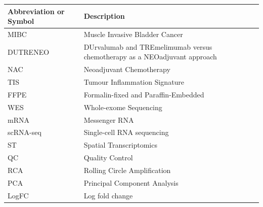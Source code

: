 \documentclass[
	a4paper, %
	fontsize=10pt, %
	twoside=true, %
	open=any, %
	numbers=noenddot, %
]{kaobook}
\begin{document}
\begin{center}
\begin{tabular}{@{} l p{9cm} @{}}
	\toprule
	\textbf{Abbreviation or Symbol} & \textbf{Description} \\
	\midrule
	MIBC      & Muscle Invasive Bladder Cancer \\ \hline
	DUTRENEO  & DUrvalumab and TREmelimumab versus chemotherapy as a NEOadjuvant approach \\ \hline
	NAC       & Neoadjuvant Chemotherapy \\ \hline
	TIS       & Tumour Inflammation Signature \\ \hline
	FFPE      & Formalin-fixed and Paraffin-Embedded \\ \hline
	WES       & Whole-exome Sequencing \\ \hline
	mRNA      & Messenger RNA \\ \hline
	scRNA-seq & Single-cell RNA sequencing \\ \hline
	ST        & Spatial Transcriptomics \\ \hline
	QC        & Quality Control \\ \hline
	RCA       & Rolling Circle Amplification \\ \hline
	PCA       & Principal Component Analysis \\ \hline
	LogFC     & Log fold change \\ %
	\bottomrule
\end{tabular}
\end{center}



\printglossary[title=Special Terms, toctitle=List of Terms] %

\end{document}

